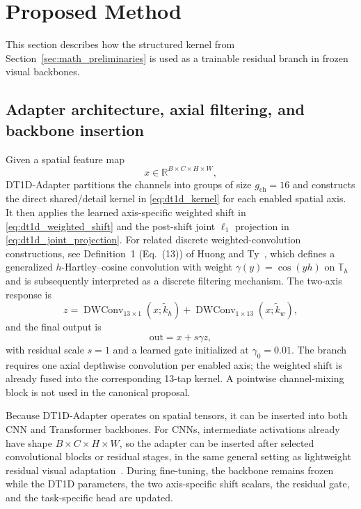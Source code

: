 \documentclass[pdflatex,sn-mathphys-num]{sn-jnl}
\theoremstyle{thmstyleone}
\theoremstyle{thmstyletwo}
\theoremstyle{thmstylethree}
\begin{document}
\section{Proposed Method}
\label{sec:proposed_method}

This section describes how the structured kernel from Section~\ref{sec:math_preliminaries} is used as a trainable residual branch in frozen visual backbones.

\subsection{Adapter architecture, axial filtering, and backbone insertion}
\label{subsec:axial_architecture}

Given a spatial feature map
\begin{equation}
x\in\mathbb{R}^{B\times C\times H\times W},
\end{equation}
DT1D-Adapter partitions the channels into groups of size $g_{\mathrm{ch}}=16$ and constructs the direct shared/detail kernel in \eqref{eq:dt1d_kernel} for each enabled spatial axis. It then applies the learned axis-specific weighted shift in \eqref{eq:dt1d_weighted_shift} and the post-shift joint $\ell_1$ projection in \eqref{eq:dt1d_joint_projection}. For related discrete weighted-convolution constructions, see Definition~1 (Eq.~(13)) of Huong and Ty~\cite{HuongTy2026Applications}, which defines a generalized $h$-Hartley--cosine convolution with weight $\gamma(y)=\cos(yh)$ on $\mathbb{T}_h$ and is subsequently interpreted as a discrete filtering mechanism. The two-axis response is
\begin{equation}
z
=
\operatorname{DWConv}_{13\times1}(x;\widetilde{k}_h)
+
\operatorname{DWConv}_{1\times13}(x;\widetilde{k}_w),
\label{eq:dt1d_axial_response}
\end{equation}
and the final output is
\begin{equation}
\mathrm{out}=x+s\gamma z,
\label{eq:dt1d_method_output}
\end{equation}
with residual scale $s=1$ and a learned gate initialized at $\gamma_0=0.01$. The branch requires one axial depthwise convolution per enabled axis; the weighted shift is already fused into the corresponding 13-tap kernel. A pointwise channel-mixing block is not used in the canonical proposal.

Because DT1D-Adapter operates on spatial tensors, it can be inserted into both CNN and Transformer backbones. For CNNs, intermediate activations already have shape $B\times C\times H\times W$, so the adapter can be inserted after selected convolutional blocks or residual stages, in the same general setting as lightweight residual visual adaptation~\cite{rebuffi2017residual,li2024repadapter}. During fine-tuning, the backbone remains frozen while the DT1D parameters, the two axis-specific shift scalars, the residual gate, and the task-specific head are updated.
\end{document}
